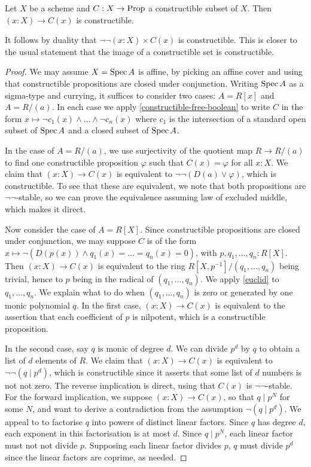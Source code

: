 \begin{theorem}
  Let $X$ be a scheme and $C : X \to \mathrm{Prop}$ a constructible subset of $X$.
  Then $(x : X) \to C(x)$ is constructible.
\end{theorem}
It follows by duality that $\neg \neg (x : X) \times C(x)$ is constructible.
This is closer to the usual statement that the image of a constructible set is constructible.
\begin{proof}
  We may assume $X = \operatorname{Spec} A$ is affine, by picking an affine cover and using that constructible propositions
  are closed under conjunction.
  Writing $\operatorname{Spec} A$ as a sigma-type and currying, it suffices to consider two cases:
  $A = R[x]$ and $A = R/(a)$.
  In each case we apply \cref{constructible-free-boolean} to write $C$
  in the form $x \mapsto \neg c_1(x) \wedge \ldots \wedge \neg c_n(x)$
  where $c_1$ is the intersection of a standard open subset of $\operatorname{Spec} A$ and
  a closed subset of $\operatorname{Spec} A$.
  
  In the case of $A = R/(a)$, we use surjectivity of the quotient map
  $R \to R/(a)$ to find one constructible proposition $\varphi$
  such that $C(x) = \varphi$ for all $x : X$. We claim
  that $(x : X) \to C(x)$ is
  equivalent to $\neg \neg (D(a) \vee \varphi)$, which is constructible.
  To see that these are equivalent, we note that both propositions are
  $\neg \neg$-stable, so we can prove the equivalence assuming law of excluded middle,
  which makes it direct.

  Now consider the case of $A = R[X]$. Since constructible propositions are closed under
  conjunction, we may suppose $C$ is of the form
  $x \mapsto \neg (D(p(x)) \wedge q_1(x) = \ldots = q_n(x) = 0)$, with
  $p, q_1,\ldots, q_n : R[X]$.
  Then $(x : X) \to C(x)$ is equivalent to the ring
  $R[X,p^{-1}]/(q_1,\ldots,q_n)$ being trivial, hence to
  $p$ being in the radical of $(q_1,\ldots,q_n)$.
  We apply \cref{euclid} to $q_1,\ldots,q_n$.
  We explain what to do when $(q_1,\ldots,q_n)$ is zero or generated by
  one monic polynomial $q$. In the first case, $(x : X) \to C(x)$
  is equivalent to the assertion that each coefficient of $p$ is nilpotent,
  which is a constructible proposition.
  
  In the second case, say $q$ is monic of degree $d$.
  We can divide $p^d$ by $q$ to obtain a list of $d$ elements of $R$.
  We claim that $(x : X) \to C(x)$ is equivalent to
  $\neg \neg (q \mid p^d)$, which is constructible
  since it asserts that some list of $d$ numbers is not not zero.
  The reverse implication is direct, using that $C(x)$ is $\neg \neg$-stable.
  For the forward implication, we suppose $(x : X) \to C(x)$, so
  that $q \mid p^N$ for some $N$, and want to derive a contradiction from
  the assumption $\neg (q \mid p^d)$.
  We appeal to \cite[lemma 3.4.3]{draft} to factorise $q$ into 
  powers of distinct linear factors. Since $q$ has degree $d$, each 
  exponent in this factorisation is at most $d$.
  Since $q \mid p^N$, each linear factor must not not divide $p$.
  Supposing each linear factor divides $p$, $q$ must divide $p^d$
  since the linear factors are coprime, as needed.
\end{proof}
